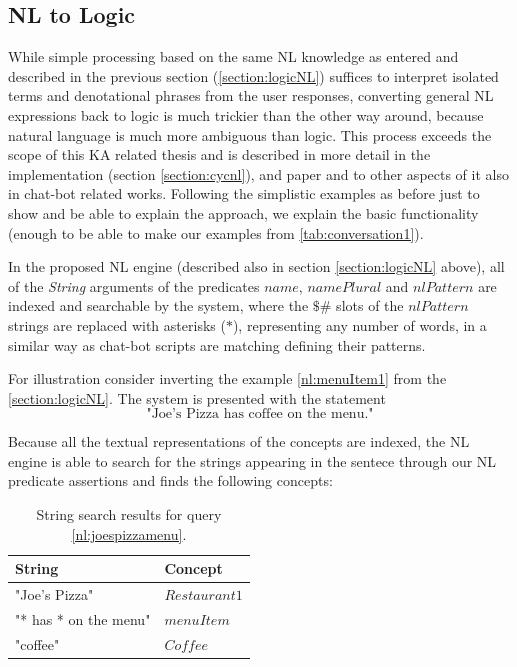 \subsection{NL to Logic}
\label{section:NLLogic}
While simple processing based on the same NL knowledge as entered and described
in the previous section (\autoref{section:logicNL}) suffices to interpret 
isolated terms and denotational phrases from the user responses, converting 
general NL expressions back to logic is much trickier than the other way 
around, because natural language is much more ambiguous than logic. This 
process exceeds the scope of this KA related thesis and is 
described in more detail in the implementation (section \ref{section:cycnl}), 
and paper 
\parencite{Schneider2015} and to other aspects of it also in chat-bot related
works\parencite{Wallace2013,Wilcox2011}. Following the simplistic examples as
before just to show and be able to explain the approach, we explain the basic 
functionality (enough to be able to make our examples from 
\autoref{tab:conversation1}).

In the proposed NL engine (described also in section \ref{section:logicNL}
above), all of the \emph{String} arguments of the predicates $name$, 
$namePlural$ and $nlPattern$ are indexed and searchable by the system, where
the $\$\#$ slots of the $nlPattern$ strings are replaced with asterisks ($*$),
representing any number of words, in a similar way as chat-bot scripts are
matching defining their patterns\parencite{Wilcox2011}.

For illustration consider inverting the example \ref{nl:menuItem1} from the
\autoref{section:logicNL}. The system is presented with the statement
\begin{equation}\label{nl:joespizzamenu}
\text{"Joe's Pizza has coffee on the menu."}
\end{equation}

Because all the textual representations of the concepts are indexed, the NL
engine is able to search for the strings appearing in the sentece through
our NL predicate assertions and finds the following concepts:
\begin{table}[H]
\centering
\caption{String search results for query \ref{nl:joespizzamenu}.}
\label{tab:nlResults1}
\begin{tabular}{|l|l|}
	\hline
	\textbf{String} & \textbf{Concept} \\
    \hline
    "Joe's Pizza" & $Restaurant1$ \\
    \hline
    "* has * on the menu" & $menuItem$ \\
    \hline
    "coffee" & $Coffee$ \\
    \hline
\end{tabular}
\end{table}

